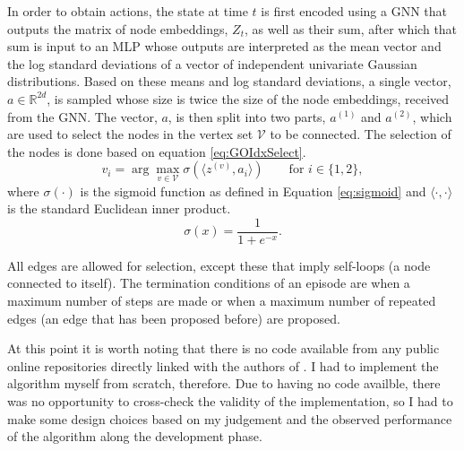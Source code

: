\documentclass{report}
\newcommand{\reals}{\mbox{\(\mathbb R\)}}
\numberwithin{equation}{section}
\numberwithin{figure}{section}
\numberwithin{table}{section}
\numberwithin{algorithm}{section}
\begin{document}



In order to obtain actions, the state at time $t$ is first encoded
using a GNN that outputs the matrix of node embeddings, $Z_t$, 
as well as their 
sum, after which that sum is input to an MLP whose outputs are 
interpreted as the mean vector and the log standard deviations 
of a vector of independent univariate Gaussian distributions.
Based on these means and log standard deviations, 
a single vector, $a\in \reals^{2d}$, is sampled whose size is 
twice the size of the node embeddings, received from the GNN. 
The vector, $a$, is then split into two parts, $a^{(1)}$ and 
$a^{(2)}$, which are used to select the nodes in the vertex 
set $\mathcal{V}$ to be connected. The selection of the nodes 
is done based on equation \ref{eq:GOIdxSelect}.
\begin{equation}\label{eq:GOIdxSelect}
  v_i = \arg \max_{v\in\mathcal{V}} \sigma(\langle z^{(v)}, a_i\rangle)\qquad \text{for $i\in \{1,2\}$},
\end{equation} 
where $\sigma(\cdot)$ is the sigmoid function as defined in 
Equation \ref{eq:sigmoid} and $\langle\cdot,\cdot\rangle$ is the 
standard Euclidean inner product.
\begin{equation}\label{eq:sigmoid}
  \sigma(x)=\frac{1}{1 + e^{-x}}.
\end{equation}

All edges are allowed for selection, except these that imply 
self-loops (a node connected to itself). The termination 
conditions of an episode are when a maximum number of steps are 
made or when a maximum number of repeated edges (an 
edge that has been proposed before) are proposed.

At this point it is worth noting that there is no 
code available from any public online repositories directly linked 
with the authors of \cite{GraphOpt}. I had to implement 
the algorithm myself from scratch, therefore. 
Due to having no code availble, there was no opportunity to 
cross-check the validity of the implementation, so I had to make 
some design choices based on my judgement and the observed 
performance of the algorithm along the development phase.
\end{document}
